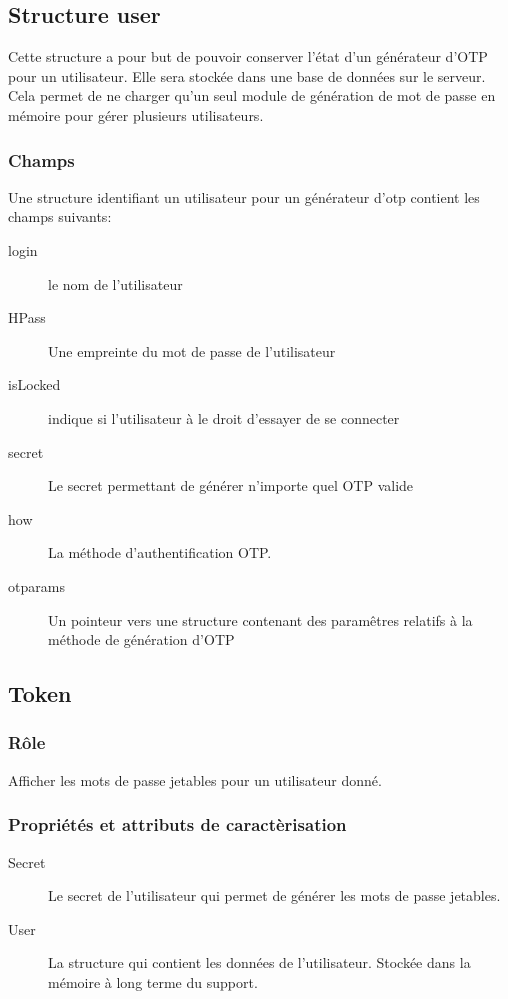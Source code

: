 \documentclass{"../../res/univ-projet"}
\begin{document}
\subsection{Structure user}
\label{sub:Structure_user}
    Cette structure a pour but de pouvoir conserver l'état d'un générateur d'OTP
    pour un utilisateur. Elle sera stockée dans une base de données sur le
    serveur. Cela permet de ne charger qu'un seul module de génération de mot de
    passe en mémoire pour gérer plusieurs utilisateurs.
    \subsubsection{Champs}
    \label{ssub:Champs}
        Une structure identifiant un utilisateur pour un générateur d'otp 
        contient les champs suivants:
        \begin{description}
            \item[login] le nom de l'utilisateur
            \item[HPass] Une empreinte du mot de passe de l'utilisateur
            \item[isLocked] indique si l'utilisateur à le droit d'essayer de
                se connecter
            \item[secret] Le secret permettant de générer n'importe quel OTP 
                valide
            \item[how] La méthode d'authentification OTP.
            \item[otparams] Un pointeur vers une structure contenant des 
                paramêtres relatifs à la méthode de génération d'OTP
        \end{description}

\subsection{Token}
    \subsubsection{Rôle}
        Afficher les mots de passe jetables pour un utilisateur donné.

    \subsubsection{Propriétés et attributs de caractèrisation}
    \begin{description}
        \item[Secret] Le secret de l'utilisateur qui permet de générer les
            mots de passe jetables.
        \item[User] La structure qui contient les données de l'utilisateur.
            Stock\'ee dans la m\'emoire à long terme du support.
    \end{description}
\end{document}

